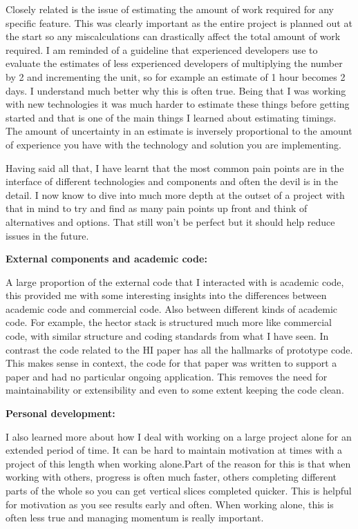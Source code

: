 \documentclass[]{../resources/final_report}
\begin{document}
Closely related is the issue of estimating the amount of work required for any specific feature. This was clearly important as the entire project is planned out at the start so any miscalculations can drastically affect the total amount of work required.  I am reminded of a guideline that experienced developers use to evaluate the estimates of less experienced developers of multiplying the number by 2 and incrementing the unit, so for example an estimate of 1 hour becomes 2 days. I understand much better why this is often true. Being that I was working with new technologies it was much harder to estimate these things before getting started and that is one of the main things I learned about estimating timings. The amount of uncertainty in an estimate is inversely proportional to the amount of experience you have with the technology and solution you are implementing.

Having said all that, I have learnt that the most common pain points are in the interface of different technologies and components and often the devil is in the detail. I now know to dive into much more depth at the outset of a project with that in mind to try and find as many pain points up front and think of alternatives and options. That still won't be perfect but it should help reduce issues in the future.

\textbf{External components and academic code:}

A large proportion of the external code that I interacted with is academic code, this provided me with some interesting insights into the differences between academic code and commercial code. Also between different kinds of academic code. For example, the hector stack is structured much more like commercial code, with similar structure and coding standards from what I have seen. In contrast the code related to the HI paper has all the hallmarks of prototype code. This makes sense in context, the code for that paper was written to support a paper and had no particular ongoing application. This removes the need for maintainability or extensibility and even to some extent keeping the code clean. 


\textbf{Personal development:}

I also learned more about how I deal with working on a large project alone for an extended period of time. It can be hard to maintain motivation at times with a project of this length when working alone.Part of the reason for this is that when working with others, progress is often much faster, others completing different parts of the whole so you can get vertical slices completed quicker. This is helpful for motivation as you see results early and often. When working alone, this is often less true and managing momentum is really important.
\end{document}
